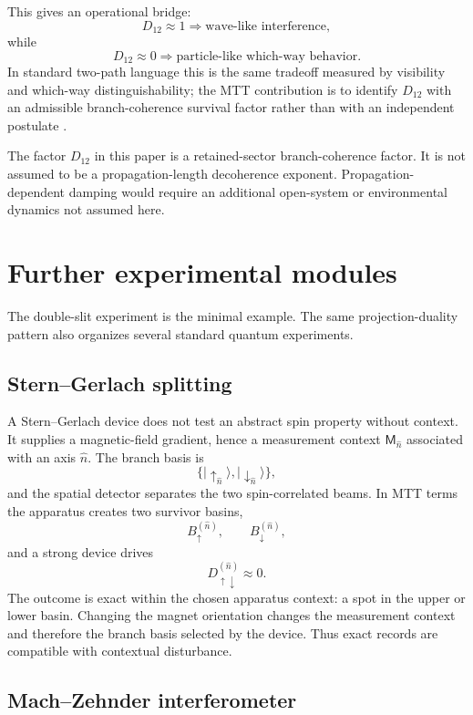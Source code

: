 \documentclass[11pt]{article}
\newcommand{\Meas}{\mathsf M}
\begin{document}
This gives an operational bridge:
\[
  D_{12}\approx1
  \Rightarrow
  \text{wave-like interference},
\]
while
\[
  D_{12}\approx0
  \Rightarrow
  \text{particle-like which-way behavior}.
\]
In standard two-path language this is the same tradeoff measured by visibility and which-way
distinguishability; the MTT contribution is to identify \(D_{12}\) with an admissible
branch-coherence survival factor rather than with an independent postulate \cite{Englert}.

\begin{remark}
The factor \(D_{12}\) in this paper is a retained-sector branch-coherence factor. It is not
assumed to be a propagation-length decoherence exponent. Propagation-dependent damping
would require an additional open-system or environmental dynamics not assumed here.
\end{remark}

\section{Further experimental modules}

The double-slit experiment is the minimal example. The same projection-duality pattern also
organizes several standard quantum experiments.

\subsection{Stern--Gerlach splitting}

A Stern--Gerlach device does not test an abstract spin property without context. It supplies
a magnetic-field gradient, hence a measurement context \(\Meas_{\hat n}\) associated with an
axis \(\hat n\). The branch basis is
\[
  \{|\uparrow_{\hat n}\rangle,|\downarrow_{\hat n}\rangle\},
\]
and the spatial detector separates the two spin-correlated beams. In MTT terms the apparatus
creates two survivor basins,
\[
  B_{\uparrow}^{(\hat n)},\qquad B_{\downarrow}^{(\hat n)},
\]
and a strong device drives
\[
  D_{\uparrow\downarrow}^{(\hat n)}\approx0.
\]
The outcome is exact within the chosen apparatus context: a spot in the upper or lower basin.
Changing the magnet orientation changes the measurement context and therefore the branch
basis selected by the device. Thus exact records are compatible with contextual disturbance.

\subsection{Mach--Zehnder interferometer}
\end{document}
